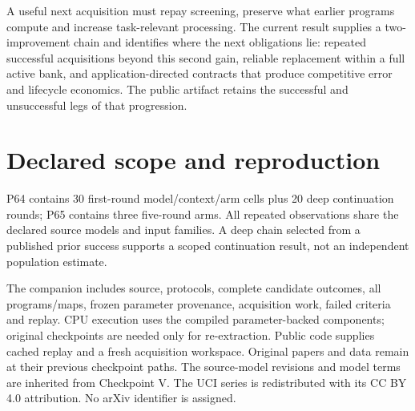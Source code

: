 \documentclass[11pt]{article}
\begin{document}
A useful next acquisition must repay screening, preserve what earlier programs compute and increase task-relevant processing. The current result supplies a two-improvement chain and identifies where the next obligations lie: repeated successful acquisitions beyond this second gain, reliable replacement within a full active bank, and application-directed contracts that produce competitive error and lifecycle economics. The public artifact retains the successful and unsuccessful legs of that progression.

\appendix
\section{Declared scope and reproduction}
P64 contains 30 first-round model/context/arm cells plus 20 deep continuation rounds; P65 contains three five-round arms. All repeated observations share the declared source models and input families. A deep chain selected from a published prior success supports a scoped continuation result, not an independent population estimate.

The companion includes source, protocols, complete candidate outcomes, all programs/maps, frozen parameter provenance, acquisition work, failed criteria and replay. CPU execution uses the compiled parameter-backed components; original checkpoints are needed only for re-extraction. Public code supplies cached replay and a fresh acquisition workspace. Original papers and data remain at their previous checkpoint paths. The source-model revisions and model terms are inherited from Checkpoint V. The UCI series is redistributed with its CC BY 4.0 attribution. No arXiv identifier is assigned.
\end{document}
